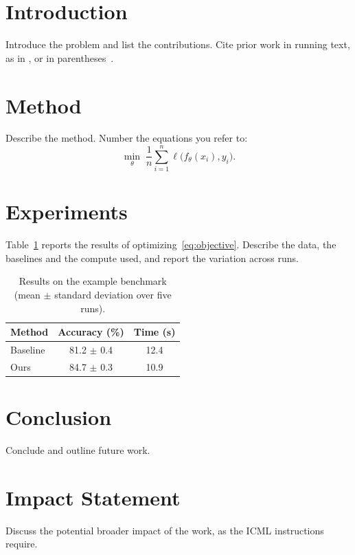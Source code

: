 \documentclass{article}
\begin{document}

\printAffiliationsAndNotice{\icmlEqualContribution}

\begin{abstract}
State the problem, the approach and the main result in a single
paragraph.
\end{abstract}

\section{Introduction}
Introduce the problem and list the contributions. Cite prior work in
running text, as in \citet{knuth1984texbook}, or in
parentheses~\citep{lamport1994latex}.

\section{Method}
Describe the method. Number the equations you refer to:
\begin{equation}
  \label{eq:objective}
  \min_{\theta} \; \frac{1}{n} \sum_{i=1}^{n} \ell\bigl(f_\theta(x_i), y_i\bigr) .
\end{equation}

\section{Experiments}
Table~\ref{tab:results} reports the results of
optimizing~\eqref{eq:objective}. Describe the data, the baselines and the
compute used, and report the variation across runs.

\begin{table}[!htb]
  \caption{Results on the example benchmark (mean $\pm$ standard deviation over five runs).}
  \label{tab:results}
  \centering
  \begin{tabular}{lcc}
    \toprule
    Method   & Accuracy (\%)  & Time (s) \\
    \midrule
    Baseline & 81.2 $\pm$ 0.4 & 12.4     \\
    Ours     & 84.7 $\pm$ 0.3 & 10.9     \\
    \bottomrule
  \end{tabular}
\end{table}

\section{Conclusion}
Conclude and outline future work.

\section*{Impact Statement}
Discuss the potential broader impact of the work, as the ICML instructions
require.


\end{document}
